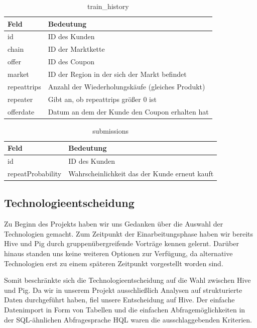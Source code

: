 \begin{table}[h]
\centering
\begin{tabular}{l|l}
	\textbf{Feld} & \textbf{Bedeutung}  \\ 
	\hline id & ID des Kunden \\ 
	\hline chain & ID der Marktkette \\ 
	\hline offer  & ID des Coupon  \\ 
	\hline market & ID der Region in der sich der Markt befindet  \\ 
	\hline repeattrips & Anzahl der Wiederholungskäufe (gleiches Produkt)  \\ 
	\hline repeater & Gibt an, ob repeattrips größer 0 ist \\ 
	\hline offerdate & Datum an dem der Kunde den Coupon erhalten hat 
	\vspace{0.3cm} \\ 
\end{tabular} 
\caption{train\_history}
\label{tab:trainhistory}
\end{table}

\begin{table}[h]
	\centering
\begin{tabular}{l|l}
	\textbf{Feld} & \textbf{Bedeutung}  \\ 
	\hline id & ID des Kunden \\ 
	\hline repeatProbability & Wahrscheinlichkeit das der Kunde erneut kauft 
	\vspace{0.3cm} \\
\end{tabular} 
\caption{submissions}
\label{tab:submissions}
\end{table}

\subsection{Technologieentscheidung}
Zu Beginn des Projekts haben wir uns Gedanken über die Auswahl der Technologien gemacht. Zum Zeitpunkt der Einarbeitungsphase haben wir bereits Hive und Pig durch gruppenübergreifende Vorträge kennen gelernt. Darüber hinaus standen uns keine weiteren Optionen zur Verfügung, da alternative Technologien erst zu einem späteren Zeitpunkt vorgestellt worden sind.

Somit beschränkte sich die Technologieentscheidung auf die Wahl zwischen Hive und Pig. Da wir in unserem Projekt ausschließlich Analysen auf strukturierte Daten durchgeführt haben, fiel unsere Entscheidung auf Hive. Der einfache Datenimport in Form von Tabellen und die einfachen Abfragemöglichkeiten in der SQL-ähnlichen Abfragesprache HQL waren die ausschlaggebenden Kriterien.

